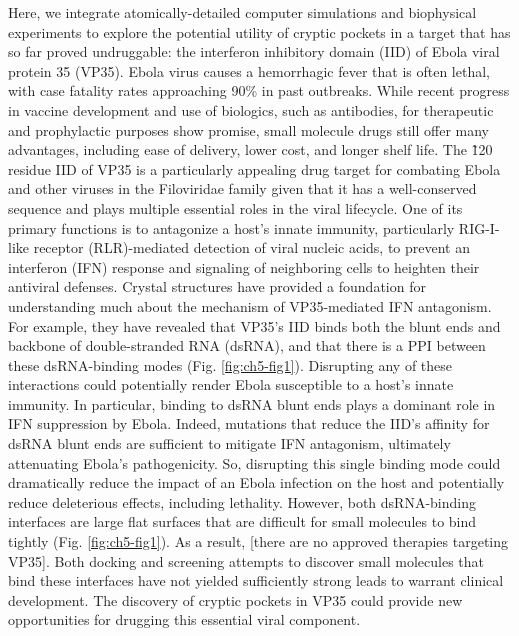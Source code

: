 \documentclass[../main.tex]{subfiles}
\begin{document}
    Here, we integrate atomically-detailed computer simulations and biophysical experiments to explore the potential utility of cryptic pockets in a target that has so far proved undruggable: the interferon inhibitory domain (IID) of Ebola viral protein 35 (VP35). Ebola virus causes a hemorrhagic fever that is often lethal, with case fatality rates approaching 90\% in past outbreaks\cite{keshwara_toward_2017,mulangu_randomized_2019}. While recent progress in vaccine development and use of biologics, such as antibodies, for therapeutic and prophylactic purposes show promise\cite{mulangu_randomized_2019}, small molecule drugs still offer many advantages, including ease of delivery, lower cost, and longer shelf life. The \~120 residue IID of VP35 is a particularly appealing drug target for combating Ebola and other viruses in the Filoviridae family given that it has a well-conserved sequence and plays multiple essential roles in the viral lifecycle\cite{messaoudi_filovirus_2015}. One of its primary functions is to antagonize a host’s innate immunity, particularly RIG-I-like receptor (RLR)-mediated detection of viral nucleic acids, to prevent an interferon (IFN) response and signaling of neighboring cells to heighten their antiviral defenses\cite{cardenas_ebola_2006,basler_ebola_2003,hartman_c-terminal_2004}. Crystal structures have provided a foundation for understanding much about the mechanism of VP35-mediated IFN antagonism\cite{leung_structure_2009,leung_structural_2010}. For example, they have revealed that VP35’s IID binds both the blunt ends and backbone of double-stranded RNA (dsRNA), and that there is a PPI between these dsRNA-binding modes (Fig. \ref{fig:ch5-fig1})\cite{leung_structural_2010}. Disrupting any of these interactions could potentially render Ebola susceptible to a host’s innate immunity. In particular, binding to dsRNA blunt ends plays a dominant role in IFN suppression by Ebola\cite{edwards_differential_2016}. Indeed, mutations that reduce the IID’s affinity for dsRNA blunt ends are sufficient to mitigate IFN antagonism, ultimately attenuating Ebola’s pathogenicity\cite{edwards_differential_2016,hartman_reverse_2006,prins_mutations_2010,prins_basic_2010}. So, disrupting this single binding mode could dramatically reduce the impact of an Ebola infection on the host and potentially reduce deleterious effects, including lethality. However, both dsRNA-binding interfaces are large flat surfaces that are difficult for small molecules to bind tightly (Fig. \ref{fig:ch5-fig1}). As a result, [there are no approved therapies targeting VP35]. Both docking and screening attempts to discover small molecules that bind these interfaces have not yielded sufficiently strong leads to warrant clinical development\cite{brown_silico_2014,glanzer_silico_2016}. The discovery of cryptic pockets in VP35 could provide new opportunities for drugging this essential viral component.
\end{document}
